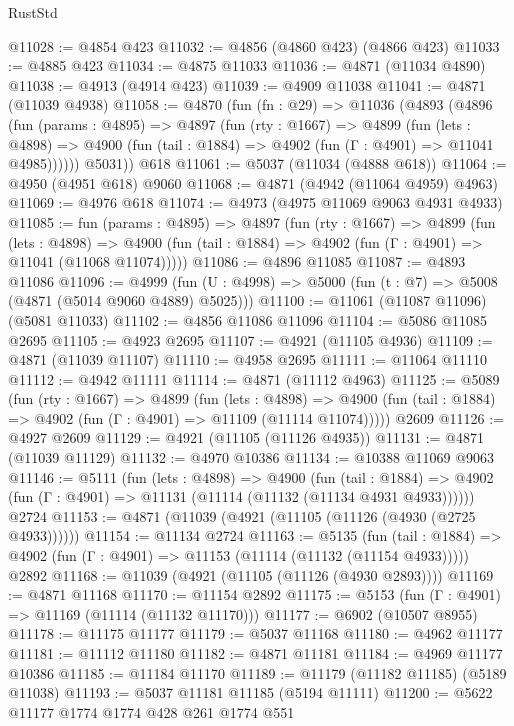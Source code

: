 \begin{lexlean}{RustStd}
\begin{coremodule}
{\begin{coremodule}
{{{{{{{{{{{{{{{{{{{{{{{{{{{{{@11028 := @4854 @423
@11032 := @4856 (@4860 @423) (@4866 @423)
@11033 := @4885 @423
@11034 := @4875 @11033
@11036 := @4871 (@11034 @4890)
@11038 := @4913 (@4914 @423)
@11039 := @4909 @11038
@11041 := @4871 (@11039 @4938)
@11058 := @4870
    (fun (fn : @29) =>
    @11036
      (@4893
        (@4896
          (fun (params : @4895) =>
          @4897
            (fun (rty : @1667) =>
            @4899
              (fun (lets : @4898) =>
              @4900 (fun (tail : @1884) => @4902 (fun (Γ : @4901) => @11041 @4985))))))
        @5031))
    @618
@11061 := @5037 (@11034 (@4888 @618))
@11064 := @4950 (@4951 @618) @9060
@11068 := @4871 (@4942 (@11064 @4959) @4963)
@11069 := @4976 @618
@11074 := @4973 (@4975 @11069 @9063 @4931 @4933)
@11085 := fun (params : @4895) =>
  @4897
    (fun (rty : @1667) =>
    @4899
      (fun (lets : @4898) =>
      @4900 (fun (tail : @1884) => @4902 (fun (Γ : @4901) => @11041 (@11068 @11074)))))
@11086 := @4896 @11085
@11087 := @4893 @11086
@11096 := @4999 (fun (U : @4998) => @5000 (fun (t : @7) => @5008 (@4871 (@5014 @9060 @4889) @5025)))
@11100 := @11061 (@11087 @11096) (@5081 @11033)
@11102 := @4856 @11086 @11096
@11104 := @5086 @11085 @2695
@11105 := @4923 @2695
@11107 := @4921 (@11105 @4936)
@11109 := @4871 (@11039 @11107)
@11110 := @4958 @2695
@11111 := @11064 @11110
@11112 := @4942 @11111
@11114 := @4871 (@11112 @4963)
@11125 := @5089
    (fun (rty : @1667) =>
    @4899
      (fun (lets : @4898) =>
      @4900 (fun (tail : @1884) => @4902 (fun (Γ : @4901) => @11109 (@11114 @11074)))))
    @2609
@11126 := @4927 @2609
@11129 := @4921 (@11105 (@11126 @4935))
@11131 := @4871 (@11039 @11129)
@11132 := @4970 @10386
@11134 := @10388 @11069 @9063
@11146 := @5111
    (fun (lets : @4898) =>
    @4900
      (fun (tail : @1884) =>
      @4902 (fun (Γ : @4901) => @11131 (@11114 (@11132 (@11134 @4931 @4933))))))
    @2724
@11153 := @4871 (@11039 (@4921 (@11105 (@11126 (@4930 (@2725 @4933))))))
@11154 := @11134 @2724
@11163 := @5135
    (fun (tail : @1884) => @4902 (fun (Γ : @4901) => @11153 (@11114 (@11132 (@11154 @4933)))))
    @2892
@11168 := @11039 (@4921 (@11105 (@11126 (@4930 @2893))))
@11169 := @4871 @11168
@11170 := @11154 @2892
@11175 := @5153 (fun (Γ : @4901) => @11169 (@11114 (@11132 @11170)))
@11177 := @6902 (@10507 @8955)
@11178 := @11175 @11177
@11179 := @5037 @11168
@11180 := @4962 @11177
@11181 := @11112 @11180
@11182 := @4871 @11181
@11184 := @4969 @11177 @10386
@11185 := @11184 @11170
@11189 := @11179 (@11182 @11185) (@5189 @11038)
@11193 := @5037 @11181 @11185 (@5194 @11111)
@11200 := @5622 @11177 @1774 @1774 @428 @261 @1774 @551
}}}}}}}}}}}}}}}}}}}}}}}}}}}}}
\end{coremodule}}
\end{coremodule}
\end{lexlean}

